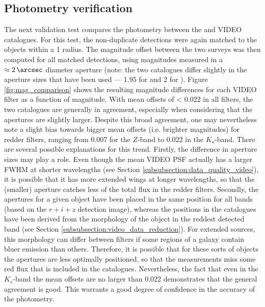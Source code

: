 \subsection{Photometry verification}
The next validation test compares the photometry between the \DESVIDEO and \cite{2013MNRAS.428.1281J} VIDEO catalogues. For this test, the non-duplicate \DESVIDEO detections were again matched to the \cite{2013MNRAS.428.1281J} objects within a \SI{1}{\arcsec} radius. The magnitude offset between the two surveys was then computed for all matched detections, using magnitudes measured in a $\approx \SI{2}{\arcsec}$ diameter aperture (note: the two catalogues differ slightly in the aperture sizes that have been used  --- \SI{1.95}{\arcsec} for \DESVIDEO and \SI{2}{\arcsec} for \citealt{2013MNRAS.428.1281J}). Figure \ref{fig:mag_comparison} shows the resulting magnitude differences for each VIDEO filter as a function of magnitude. With mean offsets of < \SI{0.022}{\magab} in all filters, the two catalogues are generally in agreement, especially when considering that the \cite{2013MNRAS.428.1281J} apertures are slightly larger.  Despite this broad agreement, one may nevertheless note a slight bias towards bigger mean offsets (i.e. brighter \citealt{2013MNRAS.428.1281J} magnitudes) for redder filters, ranging from 0.007 for the $Z$-band to 0.022 in the $K_{s}$-band. There are several possible explanations for this trend. Firstly, the difference in aperture sizes may play a role. Even though the mean VIDEO PSF actually has a larger FWHM at shorter wavelengths (see Section \ref{subsubsection:data_quality_video}), it is possible that it has more extended wings at longer wavelengths, so that the (smaller) \DESVIDEO aperture catches less of the total flux in the redder filters. Secondly, the \DESVIDEO apertures for a given object have been placed in the same position for all bands (based on the $r+i+z$ detection image), whereas the positions in the \cite{2013MNRAS.428.1281J} catalogues have been derived from the morphology of the object in the reddest detected band (see Section \ref{subsubsection:video_data_reduction}).  For extended sources, this morphology can differ between filters if some regions of a galaxy contain bluer emission than others. Therefore, it is possible that for these sorts of objects the \DESVIDEO apertures are less optimally positioned, so that the \DESVIDEO measurements miss some red flux that is included in the \cite{2013MNRAS.428.1281J} catalogues. Nevertheless, the fact that even in the $K_{s}$-band the mean offsets are no larger than \SI{0.022}{\magab} demonstrates that the general agreement is good. This warrants a good degree of confidence in the accuracy of the \DESVIDEO photometry. \par

